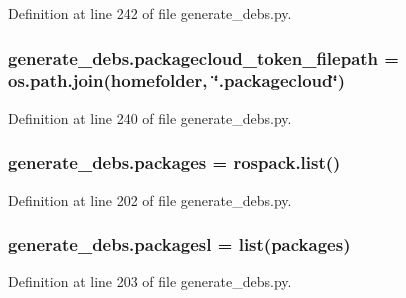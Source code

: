 Definition at line 242 of file generate\+\_\+debs.\+py.

\subsubsection[{\texorpdfstring{packagecloud\+\_\+token\+\_\+filepath}{packagecloud_token_filepath}}]{\setlength{\rightskip}{0pt plus 5cm}generate\+\_\+debs.\+packagecloud\+\_\+token\+\_\+filepath = os.\+path.\+join({\bf homefolder}, \char`\"{}.packagecloud\char`\"{})}\hypertarget{namespacegenerate__debs_a836a20b989c3c8e46255d91d10cb524f}{}\label{namespacegenerate__debs_a836a20b989c3c8e46255d91d10cb524f}


Definition at line 240 of file generate\+\_\+debs.\+py.

\subsubsection[{\texorpdfstring{packages}{packages}}]{\setlength{\rightskip}{0pt plus 5cm}generate\+\_\+debs.\+packages = rospack.\+list()}\hypertarget{namespacegenerate__debs_a40d4732827c5678f3f48354238245e1d}{}\label{namespacegenerate__debs_a40d4732827c5678f3f48354238245e1d}


Definition at line 202 of file generate\+\_\+debs.\+py.

\subsubsection[{\texorpdfstring{packagesl}{packagesl}}]{\setlength{\rightskip}{0pt plus 5cm}generate\+\_\+debs.\+packagesl = list({\bf packages})}\hypertarget{namespacegenerate__debs_acac340506bc1d8ca0d0881b9c00bfea2}{}\label{namespacegenerate__debs_acac340506bc1d8ca0d0881b9c00bfea2}


Definition at line 203 of file generate\+\_\+debs.\+py.

